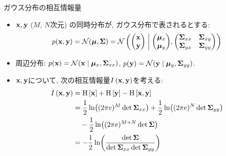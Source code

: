 \documentclass[dvipdfmx,notheorems,t]{beamer}
\begin{document}
\begin{frame}{ガウス分布の相互情報量}
\begin{itemize}
  \item $\vb{x}, \vb{y}$ ($M$, $N$次元) の同時分布が, ガウス分布で表されるとする:
  \begin{align*}
    p(\vb{x}, \vb{y}) = \mathcal{N}(\vb*{\mu}, \vb{\Sigma})
      = \mathcal{N} \left( \mqty(\vb{x} \\ \vb{y}) \middlerel|
      \mqty(\vb*{\mu}_x \\ \vb*{\mu}_y),
      \mqty(\vb{\Sigma}_{xx} & \vb{\Sigma}_{xy} \\
        \vb{\Sigma}_{yx} & \vb{\Sigma}_{yy}) \right)
  \end{align*}
  \item 周辺分布: $p(\vb{x}) = \mathcal{N}(\vb{x} \mid \vb*{\mu}_x, \vb{\Sigma}_{xx})$,
  $p(\vb{y}) = \mathcal{N}(\vb{y} \mid \vb*{\mu}_y, \vb{\Sigma}_{yy})$.
  \item $\vb{x}, \vb{y}$について, 次の相互情報量$I \left( \vb{x}, \vb{y} \right)$を考える:
  \begin{align*}
    I \left( \vb{x}, \vb{y} \right) &= \operatorname{H} \left[ \vb{x} \right] + \operatorname{H} \left[ \vb{y} \right] - \operatorname{H} \left[ \vb{x}, \vb{y} \right] \\
      &= \frac{1}{2} \ln((2\pi e)^M \det \vb{\Sigma}_{xx})
        + \frac{1}{2} \ln((2\pi e)^N \det \vb{\Sigma}_{yy}) \\
      & \quad - \frac{1}{2} \ln((2\pi e)^{M + N} \det \vb{\Sigma}) \\
      &= -\frac{1}{2} \ln(\frac{\det \vb{\Sigma}}{\det \vb{\Sigma}_{xx} \det \vb{\Sigma}_{yy}})
  \end{align*}
\end{itemize}
\end{frame}
\end{document}
